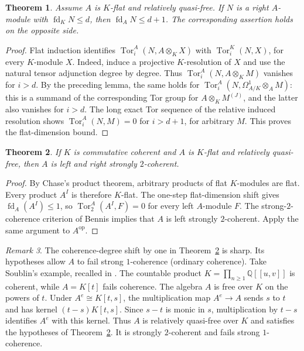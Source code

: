 \documentclass[11pt]{article}
\numberwithin{equation}{section}
\newtheorem{theorem}{Theorem}[section]
\theoremstyle{definition}
\theoremstyle{remark}
\newtheorem{remark}[theorem]{Remark}
\newcommand{\Tor}{\operatorname{Tor}}
\begin{document}
\begin{theorem}\label{sc:thm:fd-shift}
Assume $A$ is $K$-flat and relatively quasi-free.  If $N$ is a right
$A$-module with $\operatorname{fd}_K N\le d$, then
$\operatorname{fd}_A N\le d+1$.  The corresponding assertion holds on
the opposite side.
\end{theorem}
\begin{proof}
Flat induction identifies
$\Tor_i^A(N,A\otimes_K X)$ with $\Tor_i^K(N,X)$, for every $K$-module
$X$.  Indeed, induce a projective $K$-resolution of $X$ and use the
natural tensor adjunction degree by degree.
Thus $\Tor_i^A(N,A\otimes_KM)$ vanishes for $i>d$.  By the preceding
lemma, the same holds for
$\Tor_i^A(N,\Omega^1_{A/K}\otimes_A M)$: this is a summand of the
corresponding Tor group for $A\otimes_KM^{(J)}$, and the latter also
vanishes for $i>d$.  The long exact Tor sequence of the relative
induced resolution shows $\Tor_i^A(N,M)=0$ for $i>d+1$, for arbitrary
$M$.  This proves the flat-dimension bound.
\end{proof}

\begin{theorem}\label{sc:cor:SC1}
If $K$ is commutative coherent and $A$ is $K$-flat and relatively
quasi-free, then $A$ is left and right strongly $2$-coherent.
\end{theorem}
\begin{proof}
By Chase's product theorem, arbitrary products of flat $K$-modules
are flat.  Every product $A^I$ is therefore $K$-flat.
The one-step flat-dimension shift gives
$\operatorname{fd}_A(A^I)\le1$, so
$\Tor_2^A(A^I,F)=0$ for every left $A$-module $F$.
The strong-$2$-coherence criterion of Bennis
\cite[Theorems~2.3 and~2.6]{Bennis} implies that $A$ is left strongly
$2$-coherent.  Apply the same argument to $A^{\mathrm{op}}$.
\end{proof}

\begin{remark}\label{sc:rem:sharp-SC1}
The coherence-degree shift by one in Theorem~\ref{sc:cor:SC1} is
sharp.  Its hypotheses allow $A$ to fail strong $1$-coherence
(ordinary coherence).
Take Soublin's example, recalled in \cite[Section~4]{BondalZhdanovskiy}.
The countable product
$K=\prod_{n\ge1}\mathbb Q[[u,v]]$ is coherent, while $A=K[t]$ fails
coherence.  The algebra $A$ is free over $K$ on the powers of $t$.
Under $A^e\cong K[t,s]$, the multiplication map $A^e\to A$ sends $s$
to $t$ and has kernel $(t-s)K[t,s]$.  Since $s-t$ is monic in $s$,
multiplication by $t-s$ identifies $A^e$ with this kernel.  Thus
$A$ is relatively quasi-free over $K$ and satisfies the hypotheses
of Theorem~\ref{sc:cor:SC1}.  It is strongly $2$-coherent and fails
strong $1$-coherence.
\end{remark}
\end{document}
